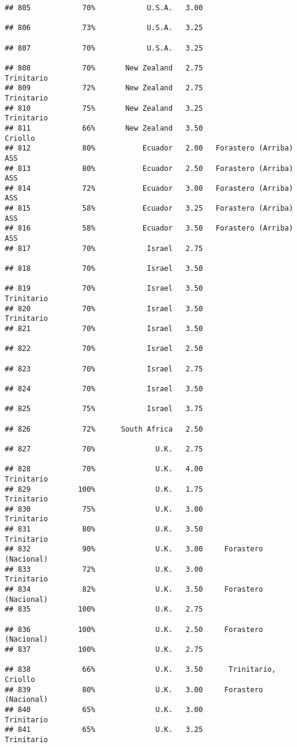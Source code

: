 \documentclass[
]{article}
\begin{document}
\begin{verbatim}
## 805            70%            U.S.A.   3.00                         
## 806            73%            U.S.A.   3.25                         
## 807            70%            U.S.A.   3.25                         
## 808            70%       New Zealand   2.75               Trinitario
## 809            72%       New Zealand   2.75               Trinitario
## 810            75%       New Zealand   3.25               Trinitario
## 811            66%       New Zealand   3.50                  Criollo
## 812            80%           Ecuador   2.00   Forastero (Arriba) ASS
## 813            80%           Ecuador   2.50   Forastero (Arriba) ASS
## 814            72%           Ecuador   3.00   Forastero (Arriba) ASS
## 815            58%           Ecuador   3.25   Forastero (Arriba) ASS
## 816            58%           Ecuador   3.50   Forastero (Arriba) ASS
## 817            70%            Israel   2.75                         
## 818            70%            Israel   3.50                         
## 819            70%            Israel   3.50               Trinitario
## 820            70%            Israel   3.50               Trinitario
## 821            70%            Israel   3.50                         
## 822            70%            Israel   2.50                         
## 823            70%            Israel   2.75                         
## 824            70%            Israel   3.50                         
## 825            75%            Israel   3.75                         
## 826            72%      South Africa   2.50                         
## 827            70%              U.K.   2.75                         
## 828            70%              U.K.   4.00               Trinitario
## 829           100%              U.K.   1.75               Trinitario
## 830            75%              U.K.   3.00               Trinitario
## 831            80%              U.K.   3.50               Trinitario
## 832            90%              U.K.   3.00     Forastero (Nacional)
## 833            72%              U.K.   3.00               Trinitario
## 834            82%              U.K.   3.50     Forastero (Nacional)
## 835           100%              U.K.   2.75                         
## 836           100%              U.K.   2.50     Forastero (Nacional)
## 837           100%              U.K.   2.75                         
## 838            66%              U.K.   3.50      Trinitario, Criollo
## 839            80%              U.K.   3.00     Forastero (Nacional)
## 840            65%              U.K.   3.00               Trinitario
## 841            65%              U.K.   3.25               Trinitario

\end{verbatim}
\end{document}
